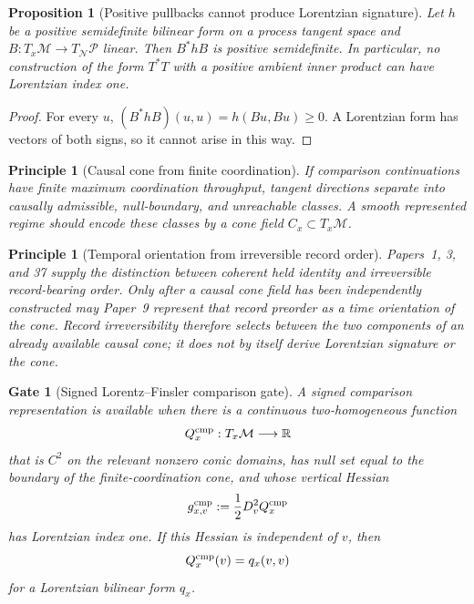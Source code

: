 \documentclass[11pt]{article}
\newtheorem{proposition}[theorem]{Proposition}
\newtheorem{principle}[theorem]{Principle}
\newtheorem{gate}[theorem]{Gate}
\theoremstyle{remark}
\newcommand{\Mgeom}{\mathcal M}
\newcommand{\Pproc}{\mathcal P}
\newcommand{\Qcmp}{Q^{\rm cmp}}
\begin{document}
\begin{proposition}[Positive pullbacks cannot produce Lorentzian signature]
\label{prop:positive-pullback-no-lorentz}
Let $h$ be a positive semidefinite bilinear form on a process tangent space and $B:T_x\Mgeom\to T_{\mathcal N}\Pproc$ linear.  Then $B^*hB$ is positive semidefinite.  In particular, no construction of the form $T^*T$ with a positive ambient inner product can have Lorentzian index one.
\end{proposition}

\begin{proof}
For every $u$, $(B^*hB)(u,u)=h(Bu,Bu)\ge0$.  A Lorentzian form has vectors of both signs, so it cannot arise in this way.
\end{proof}

\begin{principle}[Causal cone from finite coordination]
If comparison continuations have finite maximum coordination throughput, tangent directions separate into causally admissible, null-boundary, and unreachable classes.  A smooth represented regime should encode these classes by a cone field $C_x\subset T_x\Mgeom$.
\end{principle}

\begin{principle}[Temporal orientation from irreversible record order]
Papers~1, 3, and 37 supply the distinction between coherent held identity and irreversible record-bearing order.  Only after a causal cone field has been independently constructed may Paper~9 represent that record preorder as a time orientation of the cone.  Record irreversibility therefore selects between the two components of an already available causal cone; it does not by itself derive Lorentzian signature or the cone.
\end{principle}

\begin{gate}[Signed Lorentz--Finsler comparison gate]
\label{gate:signed-comparison}
A signed comparison representation is available when there is a continuous two-homogeneous function
\[
        \Qcmp_x:T_x\Mgeom\longrightarrow\mathbb R
\]
that is $C^2$ on the relevant nonzero conic domains, has null set equal to the boundary of the finite-coordination cone, and whose vertical Hessian
\[
        g^{\rm cmp}_{x,v}
        :=\frac12D_v^2\Qcmp_x
\]
has Lorentzian index one.  If this Hessian is independent of $v$, then
\[
        \Qcmp_x(v)=q_x(v,v)
\]
for a Lorentzian bilinear form $q_x$.
\end{gate}
\end{document}
